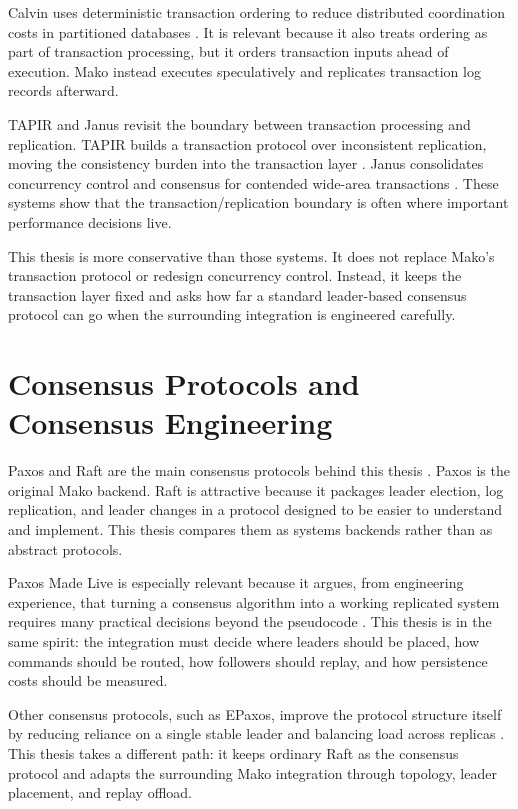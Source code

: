 Calvin uses deterministic transaction ordering to reduce distributed
coordination costs in partitioned databases \cite{calvin-sigmod12}. It is
relevant because it also treats ordering as part of transaction processing,
but it orders transaction inputs ahead of execution. Mako instead executes
speculatively and replicates transaction log records afterward.

TAPIR and Janus revisit the boundary between transaction processing and
replication. TAPIR builds a transaction protocol over inconsistent
replication, moving the consistency burden into the transaction layer
\cite{tapir-sosp15}. Janus consolidates concurrency control and consensus for
contended wide-area transactions \cite{janus-osdi16}. These systems show that
the transaction/replication boundary is often where important performance
decisions live.

This thesis is more conservative than those systems. It does not replace
Mako's transaction protocol or redesign concurrency control. Instead, it keeps
the transaction layer fixed and asks how far a standard leader-based consensus
protocol can go when the surrounding integration is engineered carefully.

\section{Consensus Protocols and Consensus Engineering}

Paxos and Raft are the main consensus protocols behind this thesis
\cite{paxos-made-simple,raft-atc14}. Paxos is the original Mako backend. Raft
is attractive because it packages leader election, log replication, and leader
changes in a protocol designed to be easier to understand and implement. This
thesis compares them as systems backends rather than as abstract protocols.

Paxos Made Live is especially relevant because it argues, from engineering
experience, that turning a consensus algorithm into a working replicated
system requires many practical decisions beyond the pseudocode
\cite{paxos-made-live}. This thesis is in the same spirit: the integration
must decide where leaders should be placed, how commands should be routed, how
followers should replay, and how persistence costs should be measured.

Other consensus protocols, such as EPaxos, improve the protocol structure
itself by reducing reliance on a single stable leader and balancing load
across replicas \cite{epaxos-sosp13}. This thesis takes a different path: it
keeps ordinary Raft as the consensus protocol and adapts the surrounding Mako
integration through topology, leader placement, and replay offload.

